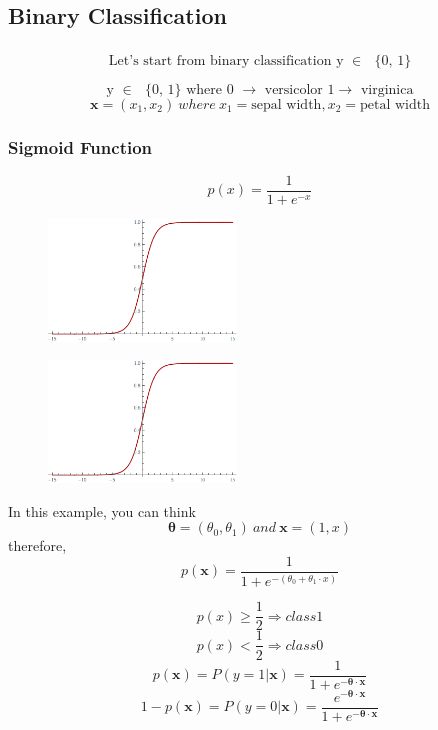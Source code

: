 \documentclass{beamer}
\begin{document}
\subsection{Binary Classification}
\begin{frame}
\frametitle{}
\[\text{Let's start from binary classification y $\in $ $\{$0, 1$\}$}\]

\[\text{y $\in $ $\{$0, 1$\}$   where 0 $\to $ versicolor 1$\to $ virginica}\]
\[	
	\mathbf{x} = (x_ 1, x_ 2) \
		where \ x_1 = \text{sepal width}, x_2 = \text{petal width}\]
\end{frame}
\begin{frame}
\frametitle{Sigmoid Function}
\[p(x)=\frac{1}{1+e^{-x}}\]
\begin{figure}[t]
\includegraphics[width=5cm]{graphics/1d-sigmoid}
\centering
\end{figure}
\end{frame}
\begin{frame}
\begin{multicols}{2} %
\begin{figure}[t]
\includegraphics[width=5cm]{graphics/1d-sigmoid}
\centering
\end{figure}
\columnbreak  %
In this example, you can think 
\[ \bm{\theta} = (\theta_{0}, \theta_{1}) \ and \ \mathbf{x} = (1, x)\]
therefore, 
\[p(\mathbf{x}) =  \frac{1}{1+e^{- ( \theta_{0} +  \theta_{1} \cdot  x )}} \]
\end{multicols}

\begin{multicols}{2}
\[p(x) \geq \frac{1}{2}  \Rightarrow class 1\]
\[p(x)<\frac{1}{2}  \Rightarrow class 0\]
\columnbreak 
\[p(\mathbf{x})=P(y=1|\mathbf{x}) = \frac{1}{1+e^{-\bm{\theta} \cdot\mathbf{x}}}\]
\[1-p(\mathbf{x})=P(y=0|\mathbf{x}) = \frac{e^{-\bm{\theta} \cdot \mathbf{x}}} {1+e^{-\bm{\theta}\cdot \mathbf{x}}} \]
\end{multicols}

\end{frame}
\end{document}

